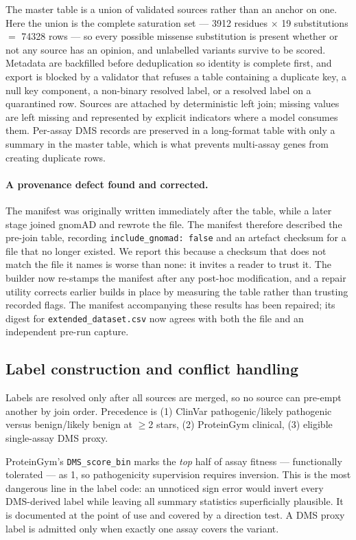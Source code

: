 \documentclass{bioinfo}
\begin{document}
The master table is a union of validated sources rather than an anchor on one.
Here the union is the complete saturation set --- \num{3912} residues
$\times$ 19 substitutions $=$ \num{74328} rows --- so every possible missense
substitution is present whether or not any source has an opinion, and
unlabelled variants survive to be scored. Metadata are backfilled before
deduplication so identity is complete first, and export is blocked by a
validator that refuses a table containing a duplicate key, a null key
component, a non-binary resolved label, or a resolved label on a quarantined
row. Sources are attached by deterministic left join; missing values are left
missing and represented by explicit indicators where a model consumes them.
Per-assay DMS records are preserved in a long-format table with only a summary
in the master table, which is what prevents multi-assay genes from creating
duplicate rows.

\paragraph{A provenance defect found and corrected.}
The manifest was originally written immediately after the table, while a later
stage joined gnomAD and rewrote the file. The manifest therefore described the
pre-join table, recording \texttt{include\_gnomad: false} and an artefact
checksum for a file that no longer existed. We report this because a checksum
that does not match the file it names is worse than none: it invites a reader
to trust it. The builder now re-stamps the manifest after any post-hoc
modification, and a repair utility corrects earlier builds in place by measuring
the table rather than trusting recorded flags. The manifest accompanying these
results has been repaired; its digest for \texttt{extended\_dataset.csv} now
agrees with both the file and an independent pre-run capture.

\subsection{Label construction and conflict handling}

Labels are resolved only after all sources are merged, so no source can
pre-empt another by join order. Precedence is (1) ClinVar pathogenic/likely
pathogenic versus benign/likely benign at $\geq$2 stars, (2) ProteinGym
clinical, (3) eligible single-assay DMS proxy.

ProteinGym's \texttt{DMS\_score\_bin} marks the \emph{top} half of assay fitness
--- functionally tolerated --- as 1, so pathogenicity supervision requires
inversion. This is the most dangerous line in the label code: an unnoticed sign
error would invert every DMS-derived label while leaving all summary statistics
superficially plausible. It is documented at the point of use and covered by a
direction test. A DMS proxy label is admitted only when exactly one assay covers
the variant.
\end{document}
